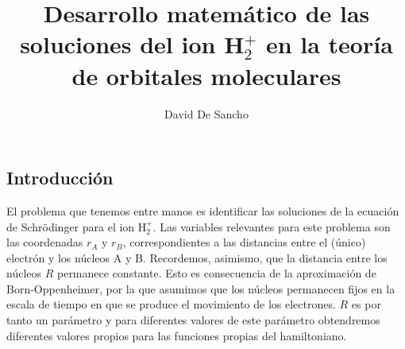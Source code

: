 \documentclass[notitlepage, amsmath,amssymb,
 aps,12pt,tightenlines]{revtex4-1}
\begin{document}
\title{Desarrollo matemático de las soluciones del ion H$_2^+$ 
en la teoría de orbitales moleculares}%

\author{David De Sancho}

\maketitle

\subsection*{Introducción}
El problema que tenemos entre manos es identificar las soluciones
de la ecuación de Schrödinger para el ion H$_2^+$. Las variables 
relevantes para este problema son las coordenadas $r_A$ y $r_B$,
correspondientes a las distancias entre el (único) electrón y
los núcleos A y B. Recordemos, asimismo, que la distancia entre los
núcleos $R$ permanece constante. Esto es consecuencia de 
la aproximación de
Born-Oppenheimer, por la que asumimos que los núcleos 
permanecen fijos en la escala de tiempo en que se produce
el movimiento de los electrones. $R$
es por tanto un parámetro y para diferentes valores de este parámetro
obtendremos diferentes valores propios para las funciones propias
del hamiltoniano.
\end{document}
